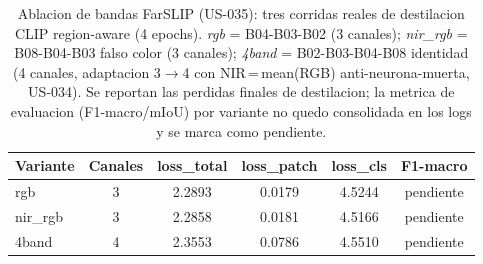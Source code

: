\begin{table}[htbp]
\caption{Ablacion de bandas FarSLIP (US-035): tres corridas reales de
destilacion CLIP region-aware (4 epochs). \textit{rgb} = B04-B03-B02 (3 canales);
\textit{nir\_rgb} = B08-B04-B03 falso color (3 canales); \textit{4band} =
B02-B03-B04-B08 identidad (4 canales, adaptacion 3$\rightarrow$4 con
NIR\,=\,mean(RGB) anti-neurona-muerta, US-034). Se reportan las perdidas finales
de destilacion; la metrica de evaluacion (F1-macro/mIoU) por variante no quedo
consolidada en los logs y se marca como pendiente.}
\label{tab:band_ablation}
\centering
\begin{tabular}{lccccc}
\toprule
\textbf{Variante} & \textbf{Canales} & \textbf{loss\_total} & \textbf{loss\_patch} & \textbf{loss\_cls} & \textbf{F1-macro} \\
\midrule
rgb     & 3 & 2.2893 & 0.0179 & 4.5244 & pendiente \\
nir\_rgb & 3 & 2.2858 & 0.0181 & 4.5166 & pendiente \\
4band   & 4 & 2.3553 & 0.0786 & 4.5510 & pendiente \\
\bottomrule
\end{tabular}
\end{table}
